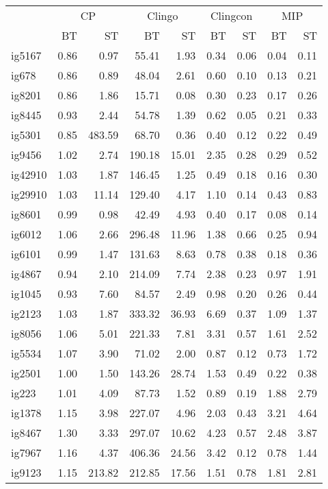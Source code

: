 \begin{longtable}{l|rr|rr|rr|rr}
\hline
& \multicolumn{2}{c}{CP} &  \multicolumn{2}{c}{Clingo} &  \multicolumn{2}{c}{Clingcon} &  \multicolumn{2}{c}{MIP} \\
 & BT & ST & BT & ST & BT & ST & BT & ST \\
\hline
ig5167 & 0.86 & 0.97 & 55.41 & 1.93 & 0.34 & 0.06 & 0.04 & 0.11 \\
ig678 & 0.86 & 0.89 & 48.04 & 2.61 & 0.60 & 0.10 & 0.13 & 0.21 \\
ig8201 & 0.86 & 1.86 & 15.71 & 0.08 & 0.30 & 0.23 & 0.17 & 0.26 \\
ig8445 & 0.93 & 2.44 & 54.78 & 1.39 & 0.62 & 0.05 & 0.21 & 0.33 \\
ig5301 & 0.85 & 483.59 & 68.70 & 0.36 & 0.40 & 0.12 & 0.22 & 0.49 \\
ig9456 & 1.02 & 2.74 & 190.18 & 15.01 & 2.35 & 0.28 & 0.29 & 0.52 \\
ig42910 & 1.03 & 1.87 & 146.45 & 1.25 & 0.49 & 0.18 & 0.16 & 0.30 \\
ig29910 & 1.03 & 11.14 & 129.40 & 4.17 & 1.10 & 0.14 & 0.43 & 0.83 \\
ig8601 & 0.99 & 0.98 & 42.49 & 4.93 & 0.40 & 0.17 & 0.08 & 0.14 \\
ig6012 & 1.06 & 2.66 & 296.48 & 11.96 & 1.38 & 0.66 & 0.25 & 0.94 \\
ig6101 & 0.99 & 1.47 & 131.63 & 8.63 & 0.78 & 0.38 & 0.18 & 0.36 \\
ig4867 & 0.94 & 2.10 & 214.09 & 7.74 & 2.38 & 0.23 & 0.97 & 1.91 \\
ig1045 & 0.93 & 7.60 & 84.57 & 2.49 & 0.98 & 0.20 & 0.26 & 0.44 \\
ig2123 & 1.03 & 1.87 & 333.32 & 36.93 & 6.69 & 0.37 & 1.09 & 1.37 \\
ig8056 & 1.06 & 5.01 & 221.33 & 7.81 & 3.31 & 0.57 & 1.61 & 2.52 \\
ig5534 & 1.07 & 3.90 & 71.02 & 2.00 & 0.87 & 0.12 & 0.73 & 1.72 \\
ig2501 & 1.00 & 1.50 & 143.26 & 28.74 & 1.53 & 0.49 & 0.22 & 0.38 \\
ig223 & 1.01 & 4.09 & 87.73 & 1.52 & 0.89 & 0.19 & 1.88 & 2.79 \\
ig1378 & 1.15 & 3.98 & 227.07 & 4.96 & 2.03 & 0.43 & 3.21 & 4.64 \\
ig8467 & 1.30 & 3.33 & 297.07 & 10.62 & 4.23 & 0.57 & 2.48 & 3.87 \\
ig7967 & 1.16 & 4.37 & 406.36 & 24.56 & 3.42 & 0.12 & 0.78 & 1.44 \\
ig9123 & 1.15 & 213.82 & 212.85 & 17.56 & 1.51 & 0.78 & 1.81 & 2.81 \\

\end{longtable}
